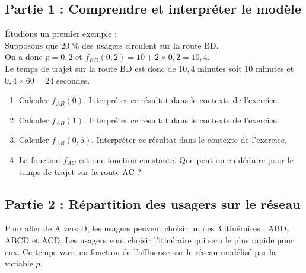 \documentclass[a4paper,11pt,exos]{nsi} %
\begin{document}
\subsection*{Partie 1 : Comprendre et interpréter le modèle}

Étudions un premier exemple :\\
Supposons que 20 \% des usagers circulent sur la route BD.\\
On a donc $p=0,2$ et $f_{BD}(0,2)=10+2\times0,2=10,4$.\\
Le temps de trajet sur la route BD est donc de $10,4$ minutes soit $10$ minutes et $0,4\times 60= 24$ secondes.

\begin{enumerate}
    \item Calculer $f_{AB}(0)$. Interpréter ce résultat dans le contexte de l’exercice.\\[.5em]
    \item Calculer $f_{AB}(1)$. Interpréter ce résultat dans le contexte de l’exercice.\\[.5em]
    \item Calculer $f_{AB}(0,5)$. Interpréter ce résultat dans le contexte de l’exercice.\\[.5em]
    \item La fonction $f_{AC}$ est une fonction constante. Que peut-on en déduire pour le temps de trajet sur la route AC ?\\[.5em]
\end{enumerate}

\subsection*{Partie 2 : Répartition des usagers sur le réseau}
Pour aller de A vers D, les usagers peuvent choisir un des 3 itinéraires : ABD, ABCD et ACD. Les usagers vont
choisir l’itinéraire qui sera le plus rapide pour eux. Ce temps varie en fonction de l’affluence sur le réseau modélisé par la variable $p$.
\end{document}
